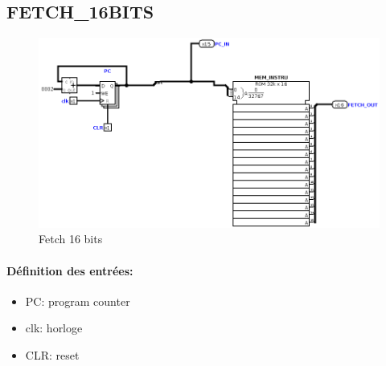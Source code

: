 \documentclass[a4paper]{article} %
\begin{document}
\subsection{FETCH\_16BITS}
\begin{figure}[H]
    \centering
    \includegraphics[width=1\textwidth]{src/FETCH.png}
    \caption{Fetch 16 bits}
    \label{fetch_16bits}
\end{figure}
\paragraph{Définition des entrées:}
\begin{itemize}
    \item     PC: program counter
    \item     clk: horloge
    \item     CLR: reset
\end{itemize}
\end{document}
